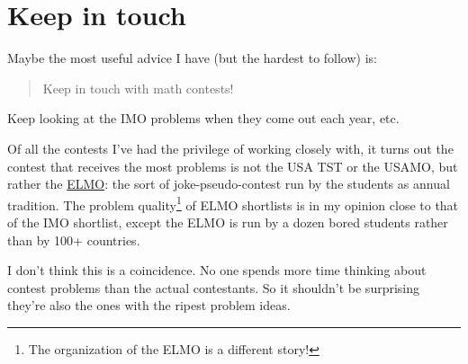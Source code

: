 \documentclass[11pt]{scrartcl}
\theoremstyle{inlined}
\begin{document}
%
%
%
%

\section{Keep in touch}
Maybe the most useful advice I have (but the hardest to follow) is:
\begin{quote}
   Keep in touch with math contests!
\end{quote}
Keep looking at the IMO problems when they come out each year, etc.

Of all the contests I've had the privilege of working closely with,
it turns out the contest that receives the most problems
is not the USA TST or the USAMO, but rather the
\href{http://web.evanchen.cc/elmo/general.html}{ELMO}:
the sort of joke-pseudo-contest run by the students as annual tradition.
The problem quality\footnote{The organization of the ELMO is a different story!}
of ELMO shortlists is in my opinion
close to that of the IMO shortlist, except the ELMO is run by
a dozen bored students rather than by 100+ countries.

I don't think this is a coincidence.
No one spends more time thinking about contest problems
than the actual contestants.
So it shouldn't be surprising they're also the ones with the
ripest problem ideas.

\end{document}
